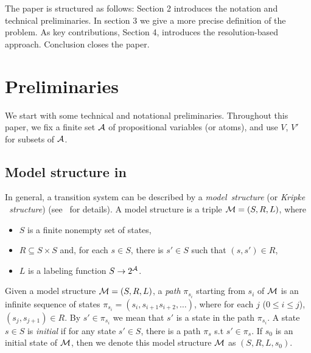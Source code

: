 \documentclass{article}
\begin{document}
The paper is structured as follows:  Section 2
introduces the notation and technical preliminaries.
In section 3 we give a more precise definition of the problem.
 As key contributions, Section 4, introduces the resolution-based approach.
  Conclusion closes the paper.
%
%
\section{Preliminaries}
We start with some technical and notational preliminaries. Throughout this paper, we fix a finite set ${\cal A}$ of propositional variables (or atoms), and use $V$, $V'$ for subsets of ${\cal A}$.
\subsection{Model structure in \CTL}
 In general, a transition system
 can be described by a \emph{model\ structure} (or \emph{Kripke \ structure}) (see~\cite{Baier:PMC:2008} for details). A model structure is a triple ${\cal M}=(S,R,L)$, where
\begin{itemize}
  \item $S$ is a finite nonempty set of states, %
  \item $R\subseteq S\times S$ and, for each $s\in S$, there
  is $s'\in S$ such that $(s,s')\in R$,
  \item $L$ is a labeling function $S\rightarrow 2^{\cal A}$.
\end{itemize}
Given a model structure ${\cal M}=(S,R,L)$, a \emph{path} $\pi_{s_i}$ starting from $s_i$ of ${\cal M}$ is an infinite sequence of states $\pi_{s_i}=(s_i, s_{i+1} s_{i+2},\dots)$, where for each $j$ ($0\leq i\leq j$), $(s_j, s_{j+1}) \in R$. By $s'\in \pi_{s_i}$ we mean that $s'$ is a state in the path $\pi_{s_i}$.
A state $s\in S$ is {\em initial} if for any state $s'\in S$, there is a path $\pi_s$ s.t $s'\in \pi_s$.
If $s_0$ is an initial state of ${\cal M}$, then we denote this model structure ${\cal M}$ as $(S,R,L,s_0)$.
\end{document}
